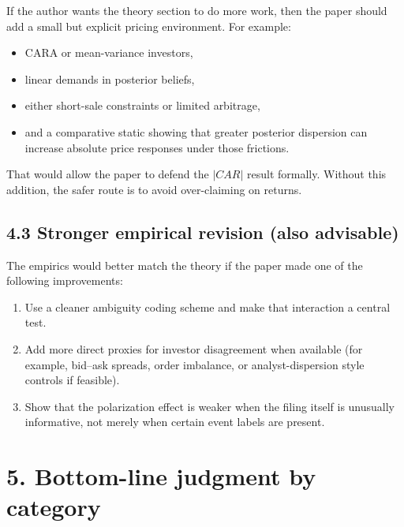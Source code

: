 \documentclass[11pt]{article}
\begin{document}
If the author wants the theory section to do more work, then the paper should add a small but explicit pricing environment. For example:

\begin{itemize}[leftmargin=1.5em]
    \item CARA or mean-variance investors,
    \item linear demands in posterior beliefs,
    \item either short-sale constraints or limited arbitrage,
    \item and a comparative static showing that greater posterior dispersion can increase absolute price responses under those frictions.
\end{itemize}

That would allow the paper to defend the $|CAR|$ result formally. Without this addition, the safer route is to avoid over-claiming on returns.

\subsection*{4.3 Stronger empirical revision (also advisable)}

The empirics would better match the theory if the paper made one of the following improvements:

\begin{enumerate}[leftmargin=1.5em]
    \item Use a cleaner ambiguity coding scheme and make that interaction a central test.
    \item Add more direct proxies for investor disagreement when available (for example, bid--ask spreads, order imbalance, or analyst-dispersion style controls if feasible).
    \item Show that the polarization effect is weaker when the filing itself is unusually informative, not merely when certain event labels are present.
\end{enumerate}

\section*{5. Bottom-line judgment by category}
\end{document}
